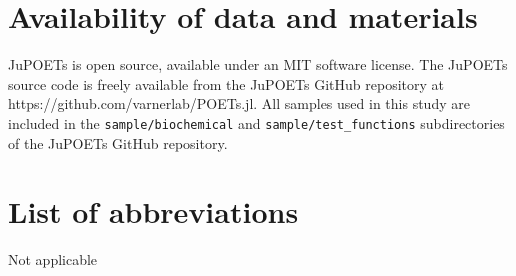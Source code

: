 \documentclass{bmcart}
\begin{document}
\begin{backmatter}
\section*{Availability of data and materials}
JuPOETs is open source, available under an MIT software license.
The JuPOETs source code is freely available from the JuPOETs GitHub repository at https://github.com/varnerlab/POETs.jl.
All samples used in this study are included in the \texttt{sample/biochemical} and \texttt{sample/test\_functions} subdirectories of the JuPOETs GitHub repository.

\section*{List of abbreviations}
Not applicable





\end{backmatter}
\end{document}

